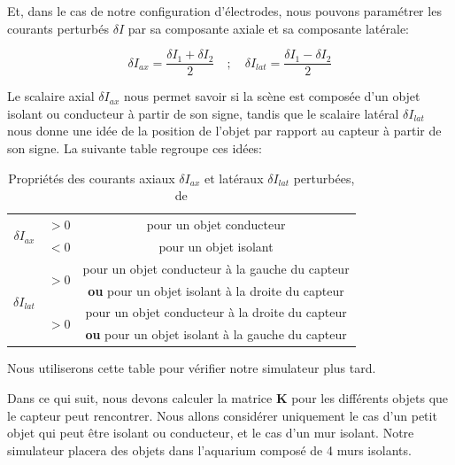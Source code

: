 Et, dans le cas de notre configuration d'électrodes, nous pouvons paramétrer les courants perturbés $\delta I$ par sa composante axiale et sa composante latérale: 

\begin{equation}
    \delta I_{ax} = \frac{\delta I_1 + \delta I_2}{2} \quad ; \quad \delta I_{lat} = \frac{\delta I_1 - \delta I_2}{2}
\end{equation}

Le scalaire axial $\delta I_{ax}$ nous permet savoir si la scène est composée d'un objet isolant ou conducteur à partir de son signe, tandis que le scalaire latéral $\delta I_{lat}$ nous donne une idée de la position de l'objet par rapport au capteur à partir de son signe. La suivante table regroupe ces idées: 

\begin{table}[h!]
    \centering
    \begin{tabular}{|c|c|c|}
        \hline
        \multirow{2}{*}{$\delta I_{ax}$} & $>0$ & pour un objet conducteur\\ \cline{2-3}
         & $<0$& pour un objet isolant \\
         \hline
         \multirow{4}{*}{$\delta I_{lat}$} & \multirow{2}{*}{$>0$} & pour un objet conducteur à la gauche du capteur \\
          & & \textbf{ou} pour un objet isolant à la droite du capteur \\ \cline{2-3}
          & \multirow{2}{*}{$>0$} & pour un objet conducteur à la droite du capteur \\
          & & \textbf{ou} pour un objet isolant à la gauche du capteur \\
          \hline
    \end{tabular}
    \caption{Propriétés des courants axiaux $\delta I_{ax}$ et latéraux $\delta I_{lat}$ perturbées, de \cite{Boyer2013}}
    \label{tab:proprietes}
\end{table}

Nous utiliserons cette table pour vérifier notre simulateur plus tard. 

Dans ce qui suit, nous devons calculer la matrice $\mathbf{K}$ pour les différents objets que le capteur peut rencontrer. Nous allons considérer uniquement le cas d'un petit objet qui peut être isolant ou conducteur, et le cas d'un mur isolant. Notre simulateur placera des objets dans l'aquarium composé de 4 murs isolants. 


